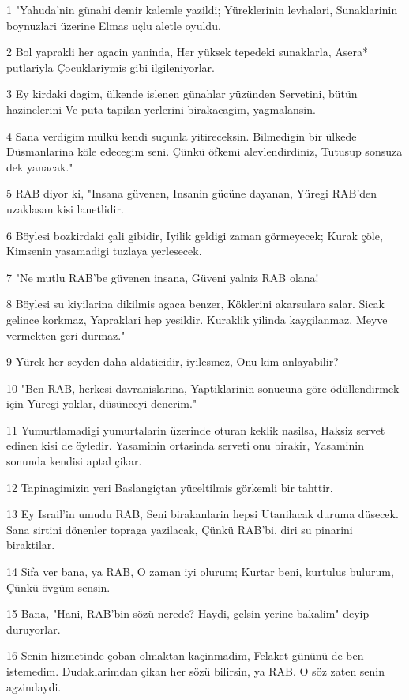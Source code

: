 \par 1 "Yahuda'nin günahi demir kalemle yazildi; Yüreklerinin levhalari, Sunaklarinin boynuzlari üzerine Elmas uçlu aletle oyuldu.
\par 2 Bol yaprakli her agacin yaninda, Her yüksek tepedeki sunaklarla, Asera* putlariyla Çocuklariymis gibi ilgileniyorlar.
\par 3 Ey kirdaki dagim, ülkende islenen günahlar yüzünden Servetini, bütün hazinelerini Ve puta tapilan yerlerini birakacagim, yagmalansin.
\par 4 Sana verdigim mülkü kendi suçunla yitireceksin. Bilmedigin bir ülkede Düsmanlarina köle edecegim seni. Çünkü öfkemi alevlendirdiniz, Tutusup sonsuza dek yanacak."
\par 5 RAB diyor ki, "Insana güvenen, Insanin gücüne dayanan, Yüregi RAB'den uzaklasan kisi lanetlidir.
\par 6 Böylesi bozkirdaki çali gibidir, Iyilik geldigi zaman görmeyecek; Kurak çöle, Kimsenin yasamadigi tuzlaya yerlesecek.
\par 7 "Ne mutlu RAB'be güvenen insana, Güveni yalniz RAB olana!
\par 8 Böylesi su kiyilarina dikilmis agaca benzer, Köklerini akarsulara salar. Sicak gelince korkmaz, Yapraklari hep yesildir. Kuraklik yilinda kaygilanmaz, Meyve vermekten geri durmaz."
\par 9 Yürek her seyden daha aldaticidir, iyilesmez, Onu kim anlayabilir?
\par 10 "Ben RAB, herkesi davranislarina, Yaptiklarinin sonucuna göre ödüllendirmek için Yüregi yoklar, düsünceyi denerim."
\par 11 Yumurtlamadigi yumurtalarin üzerinde oturan keklik nasilsa, Haksiz servet edinen kisi de öyledir. Yasaminin ortasinda serveti onu birakir, Yasaminin sonunda kendisi aptal çikar.
\par 12 Tapinagimizin yeri Baslangiçtan yüceltilmis görkemli bir tahttir.
\par 13 Ey Israil'in umudu RAB, Seni birakanlarin hepsi Utanilacak duruma düsecek. Sana sirtini dönenler topraga yazilacak, Çünkü RAB'bi, diri su pinarini biraktilar.
\par 14 Sifa ver bana, ya RAB, O zaman iyi olurum; Kurtar beni, kurtulus bulurum, Çünkü övgüm sensin.
\par 15 Bana, "Hani, RAB'bin sözü nerede? Haydi, gelsin yerine bakalim" deyip duruyorlar.
\par 16 Senin hizmetinde çoban olmaktan kaçinmadim, Felaket gününü de ben istemedim. Dudaklarimdan çikan her sözü bilirsin, ya RAB. O söz zaten senin agzindaydi.
